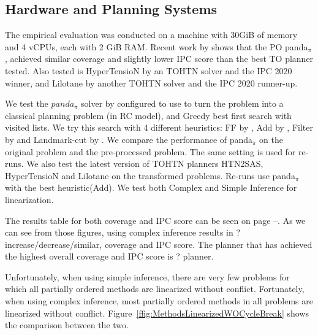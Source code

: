 \documentclass[letterpaper]{article} %
\begin{document}
\subsection{Hardware and Planning Systems}
The empirical evaluation was conducted on a machine with 30GiB of memory and 4 vCPUs, each with 2 GiB RAM. Recent work by \cite{HTN2SAS} shows that the PO panda$_\pi$, achieved similar coverage and slightly lower IPC score than the best TO planner tested. Also tested is HyperTensioN by \cite{hypertension} an TOHTN solver and the IPC 2020 winner, and Lilotane by \cite{Lilotane} another TOHTN solver and the IPC 2020 runner-up. 

We test the $panda_{\pi}$ solver by \cite{useClassicalHuristicICAPS18,useClassicalHeuristicIJCAI19,progressionsearchJAIR20} configured to use to turn the problem into a classical planning problem (in RC model), and Greedy best first search with visited lists. We try this search with 4 different heuristics: FF by \cite{FF}, Add by \cite{Add}, Filter by \cite{useClassicalHuristicICAPS18} and Landmark-cut by \cite{LM-Cut}. We compare the performance of panda$_\pi$ on the original problem and the pre-processed problem. The same setting is used for re-runs. We also test the latest version of TOHTN planners HTN2SAS, HyperTensioN and Lilotane on the transformed problems. Re-runs use panda$_{\pi}$ with the best heuristic(Add). 
We test both Complex and Simple Inference for linearization.

The results table for both coverage and IPC score can be seen on page \pageref{table:GroundedSimpleIPC}--\pageref{table:GroundedComplexIPC}.
As we can see from those figures, using complex inference results in ?  increase/decrease/similar, coverage and IPC score.
The planner that has achieved the highest overall coverage and IPC score is ? planner.



 
 
Unfortunately, when using simple inference, there are very few problems for which all partially ordered methods are linearized without conflict.
Fortunately, when using complex inference, most partially ordered methods in all problems are linearized without conflict.
Figure~\ref{ffig:MethodsLinearizedWOCycleBreak} shows the comparison between the two.




\end{document}
